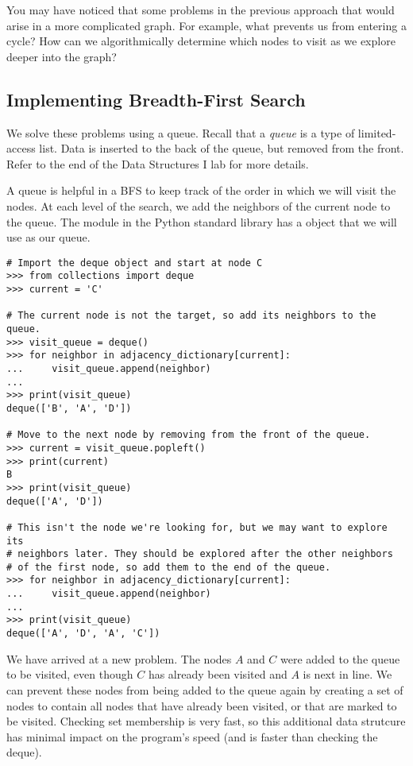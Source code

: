You may have noticed that some problems in the previous approach that would arise in a more complicated graph.
For example, what prevents us from entering a cycle?
How can we algorithmically determine which nodes to visit as we explore deeper into the graph?

\subsection*{Implementing Breadth-First Search}

We solve these problems using a queue.
Recall that a \emph{queue} is a type of limited-access list.
Data is inserted to the back of the queue, but removed from the front.
Refer to the end of the Data Structures I lab for more details.

A queue is helpful in a BFS to keep track of the order in which we will visit the nodes.
At each level of the search, we add the neighbors of the current node to the queue.
The  module in the Python standard library has a  object that we will use as our queue.

\begin{lstlisting}
# Import the deque object and start at node C
>>> from collections import deque
>>> current = 'C'

# The current node is not the target, so add its neighbors to the queue.
>>> visit_queue = deque()
>>> for neighbor in adjacency_dictionary[current]:
...     visit_queue.append(neighbor)
...
>>> print(visit_queue)
deque(['B', 'A', 'D'])

# Move to the next node by removing from the front of the queue.
>>> current = visit_queue.popleft()
>>> print(current)
B
>>> print(visit_queue)
deque(['A', 'D'])

# This isn't the node we're looking for, but we may want to explore its
# neighbors later. They should be explored after the other neighbors
# of the first node, so add them to the end of the queue.
>>> for neighbor in adjacency_dictionary[current]:
...     visit_queue.append(neighbor)
...
>>> print(visit_queue)
deque(['A', 'D', 'A', 'C'])
\end{lstlisting}

We have arrived at a new problem.
The nodes $A$ and $C$ were added to the queue to be visited, even though $C$ has already been visited and $A$ is next in line.
We can prevent these nodes from being added to the queue again by creating a set of nodes to contain all nodes that have already been visited, or that are marked to be visited.
Checking set membership is very fast, so this additional data strutcure has minimal impact on the program's speed (and is faster than checking the deque).

